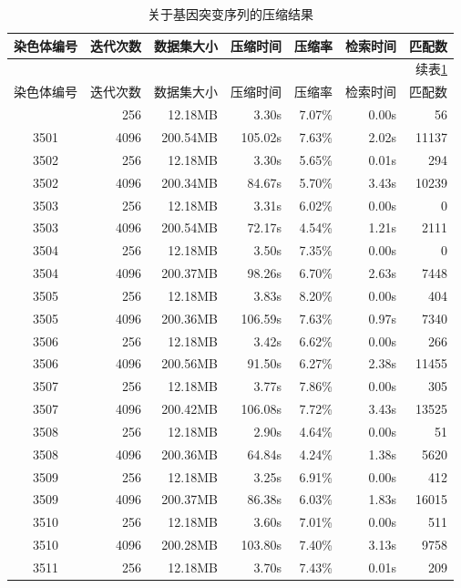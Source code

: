 ﻿\documentclass{sysuthesis}
\begin{document}
\begin{longtable}{crrrrrr}
	\caption{关于基因突变序列的压缩结果}\label{tab:dnacompress}\\
	\hline\hline
	染色体编号 & 迭代次数 & 数据集大小 & 压缩时间 & 压缩率 & 检索时间 & 匹配数 \\
	\hline
	\endfirsthead
	\multicolumn{7}{r}{续表\ref{tab:dnacompress}}\\
	\hline\hline
	染色体编号 & 迭代次数 & 数据集大小 & 压缩时间 & 压缩率 & 检索时间 & 匹配数 \\
	\hline
	\endhead
	\hline
	\endfoot
	\hline
	\endlastfoot
	3501 & 256 & 12.18MB & 3.30s & 7.07\% & 0.00s & 56 \\
	3501 & 4096 & 200.54MB & 105.02s & 7.63\% & 2.02s & 11137 \\
	3502 & 256 & 12.18MB & 3.30s & 5.65\% & 0.01s & 294 \\
	3502 & 4096 & 200.34MB & 84.67s & 5.70\% & 3.43s & 10239 \\
	3503 & 256 & 12.18MB & 3.31s & 6.02\% & 0.00s & 0 \\
	3503 & 4096 & 200.54MB & 72.17s & 4.54\% & 1.21s & 2111 \\
	3504 & 256 & 12.18MB & 3.50s & 7.35\% & 0.00s & 0 \\
	3504 & 4096 & 200.37MB & 98.26s & 6.70\% & 2.63s & 7448 \\
	3505 & 256 & 12.18MB & 3.83s & 8.20\% & 0.00s & 404 \\
	3505 & 4096 & 200.36MB & 106.59s & 7.63\% & 0.97s & 7340 \\
	3506 & 256 & 12.18MB & 3.42s & 6.62\% & 0.00s & 266 \\
	3506 & 4096 & 200.56MB & 91.50s & 6.27\% & 2.38s & 11455 \\
	3507 & 256 & 12.18MB & 3.77s & 7.86\% & 0.00s & 305 \\
	3507 & 4096 & 200.42MB & 106.08s & 7.72\% & 3.43s & 13525 \\
	3508 & 256 & 12.18MB & 2.90s & 4.64\% & 0.00s & 51 \\
	3508 & 4096 & 200.36MB & 64.84s & 4.24\% & 1.38s & 5620 \\
	3509 & 256 & 12.18MB & 3.25s & 6.91\% & 0.00s & 412 \\
	3509 & 4096 & 200.37MB & 86.38s & 6.03\% & 1.83s & 16015 \\
	3510 & 256 & 12.18MB & 3.60s & 7.01\% & 0.00s & 511 \\
	3510 & 4096 & 200.28MB & 103.80s & 7.40\% & 3.13s & 9758 \\
	3511 & 256 & 12.18MB & 3.70s & 7.43\% & 0.01s & 209 \\

\end{longtable}
\end{document}
